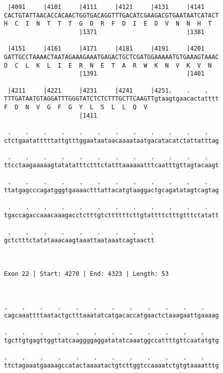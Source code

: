 \documentclass{article}
\begin{document}
\begin{Verbatim}
 |4091     |4101     |4111     |4121     |4131     |4141    
CACTGTATTAACACCACAACTGGTGACAGGTTTGACATCGAAGACGTGAATAATCATACT
H  C  I  N  T  T  T  G  D  R  F  D  I  E  D  V  N  N  H  T  
                     |1371                         |1381    
  
 |4151     |4161     |4171     |4181     |4191     |4201    
GATTGCCTAAAACTAATAGAAAGAAATGAGACTGCTCGATGGAAAAATGTGAAAGTAAAC
D  C  L  K  L  I  E  R  N  E  T  A  R  W  K  N  V  K  V  N  
                     |1391                         |1401    
  
 |4211     |4221     |4231     |4241     |4251.    .    .   
TTTGATAATGTAGGATTTGGGTATCTCTCTTTGCTTCAAGTTgtaagtgaacactatttt
F  D  N  V  G  F  G  Y  L  S  L  L  Q  V                    
                     |1411                                  
  
 .    .    .    .    .    .    .    .    .    .    .    .   
ctctgaatatttttattgtttggaataataacaaaataatgacatacatctattatttag
                                                            
 .    .    .    .    .    .    .    .    .    .    .    .   
ttcctaagaaaaagtatatatttctttctatttaaaaaatttcaatttgttagtacaagt
                                                            
 .    .    .    .    .    .    .    .    .    .    .    .   
ttatgagcccagatgggtgaaaactttattacatgtaaggactgcagatatagtcagtag
                                                            
 .    .    .    .    .    .    .    .    .    .    .    .   
tgaccagaccaaacaaagacctctttgtcttttttcttgtattttctttgtttctatatt
                                                            
 .    .    .    .    .    .    .    .    .
gctctttctatataaacaagtaaattaataaatcagtaactt
                                          
                                          
 
Exon 22 | Start: 4270 | End: 4323 | Length: 53



.    .    .    .    .    .    .    .    .    .    .    .    
cagcaaattttaatactgctttaaatatcatgacaccatgaactctaaagaattgaaaag
                                                            
.    .    .    .    .    .    .    .    .    .    .    .    
tgcttgtgagttggttatcaaggggaggatatatcaaatggccattttgttcaatatgtg
                                                            
.    .    .    .    .    .    .    .    .    .    .    .    
ttctagaaatgaaaagccatactaaaatactgtcttggtccaaaatctgtgtaaaatttg
                                                            

\end{Verbatim}
\end{document}
